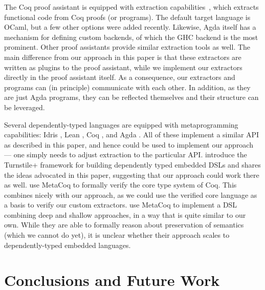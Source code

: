 \documentclass[sigplan,screen]{acmart}
\renewcommand\paragraph{\noindentparagraph}
\begin{document}
The Coq proof assistant is equipped with extraction
capabilities~\cite{10.1007/978-3-540-69407-6_39,10.1007/3-540-39185-1_12},
which extracts functional code from Coq proofs (or programs).  The
default target language is OCaml, but a few other options were added
recently.
%
Likewise, Agda itself has a mechanism for defining custom backends, of
which the GHC backend is the most prominent.
%
Other proof assistants provide similar extraction tools as well.
%
The main difference from our approach in this paper
is that these extractors are written as plugins to the proof
assistant, while we implement our extractors directly in the proof
assistant itself.
%
As a consequence, our extractors and programs can (in principle)
communicate with each other. In addition, as they are just Agda programs, they can
be reflected themselves and their structure can be leveraged.


Several dependently-typed languages are equipped with metaprogramming
capabilities: Idris \cite{idris-refl}, Lean \cite{lean-refl},
Coq \cite{metacoq}, and Agda \cite{agda-refl}.  All of these
implement a similar API as described in this paper, and hence could be
used to implement our approach --- one simply needs to adjust
extraction to the particular API.
\citet{10.1145/3371071} introduce the Turnstile+ framework for
building dependently typed embedded DSLs and
shares the ideas advocated in this paper, suggesting that
our approach could work there as well.
\citet{10.1145/3371076} use MetaCoq to formally verify
the core type system of Coq. This combines nicely with
our approach, as we could use the verified core language
as a basis to verify our custom extractors.
\citet{10.1145/3372885.3373829} use MetaCoq to implement
a DSL combining deep and shallow approaches, in a way that
is quite similar to our own. While they are able to formally
reason about preservation of semantics (which we cannot do yet), it is unclear
whether their approach scales to dependently-typed embedded languages.

\section{Conclusions and Future Work} \label{sec:conclusion}
\end{document}
